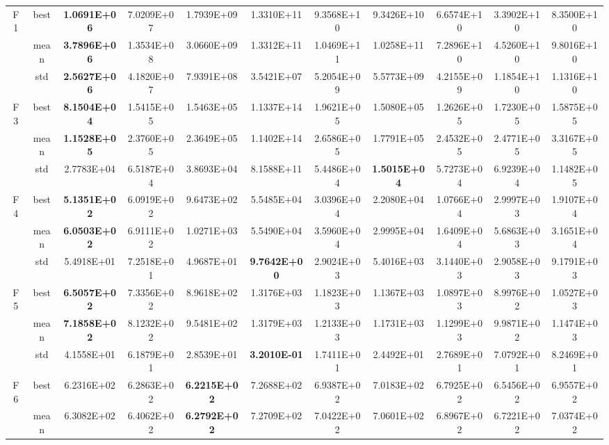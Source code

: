\documentclass{wzuthesis}
\begin{document}
\begin{longtable}{ccccccccccc}
\multirow{3}[0]{*}{F1} & best  & \textbf{1.0691E+06} & 7.0209E+07 & 1.7939E+09 & 1.3310E+11 & 9.3568E+10 & 9.3426E+10 & 6.6574E+10 & 3.3902E+10 & 8.3500E+10 \\
          & mean  & \textbf{3.7896E+06} & 1.3534E+08 & 3.0660E+09 & 1.3312E+11 & 1.0469E+11 & 1.0258E+11 & 7.2896E+10 & 4.5260E+10 & 9.8016E+10 \\
          & std   & \textbf{2.5627E+06} & 4.1820E+07 & 7.9391E+08 & 3.5421E+07 & 5.2054E+09 & 5.5773E+09 & 4.2155E+09 & 1.1854E+10 & 1.1316E+10 \\
\multirow{3}[0]{*}{F3} & best  & \textbf{8.1504E+04} & 1.5415E+05 & 1.5463E+05 & 1.1337E+14 & 1.9621E+05 & 1.5080E+05 & 1.2626E+05 & 1.7230E+05 & 1.5875E+05 \\
          & mean  & \textbf{1.1528E+05} & 2.3760E+05 & 2.3649E+05 & 1.1402E+14 & 2.6586E+05 & 1.7791E+05 & 2.4532E+05 & 2.4771E+05 & 3.3167E+05 \\
          & std   & 2.7783E+04 & 6.5187E+04 & 3.8693E+04 & 8.1588E+11 & 5.4486E+04 & \textbf{1.5015E+04} & 5.7273E+04 & 6.9239E+04 & 1.1482E+05 \\
\multirow{3}[0]{*}{F4} & best  & \textbf{5.1351E+02} & 6.0919E+02 & 9.6473E+02 & 5.5485E+04 & 3.0396E+04 & 2.2080E+04 & 1.0766E+04 & 2.9997E+03 & 1.9107E+04 \\
          & mean  & \textbf{6.0503E+02} & 6.9111E+02 & 1.0271E+03 & 5.5490E+04 & 3.5960E+04 & 2.9995E+04 & 1.6409E+04 & 5.6863E+03 & 3.1651E+04 \\
          & std   & 5.4918E+01 & 7.2518E+01 & 4.9687E+01 & \textbf{9.7642E+00} & 2.9024E+03 & 5.4016E+03 & 3.1440E+03 & 2.9058E+03 & 9.1791E+03 \\
\multirow{3}[0]{*}{F5} & best  & \textbf{6.5057E+02} & 7.3356E+02 & 8.9618E+02 & 1.3176E+03 & 1.1823E+03 & 1.1367E+03 & 1.0897E+03 & 8.9976E+02 & 1.0527E+03 \\
          & mean  & \textbf{7.1858E+02} & 8.1232E+02 & 9.5481E+02 & 1.3179E+03 & 1.2133E+03 & 1.1731E+03 & 1.1299E+03 & 9.9871E+02 & 1.1474E+03 \\
          & std   & 4.1558E+01 & 6.1879E+01 & 2.8539E+01 & \textbf{3.2010E-01} & 1.7411E+01 & 2.4492E+01 & 2.7689E+01 & 7.0792E+01 & 8.2469E+01 \\
\multirow{3}[0]{*}{F6} & best  & 6.2316E+02 & 6.2863E+02 & \textbf{6.2215E+02} & 7.2688E+02 & 6.9387E+02 & 7.0183E+02 & 6.7925E+02 & 6.5456E+02 & 6.9557E+02 \\
          & mean  & 6.3082E+02 & 6.4062E+02 & \textbf{6.2792E+02} & 7.2709E+02 & 7.0422E+02 & 7.0601E+02 & 6.8967E+02 & 6.7221E+02 & 7.0374E+02 \\

\end{longtable}
\end{document}
